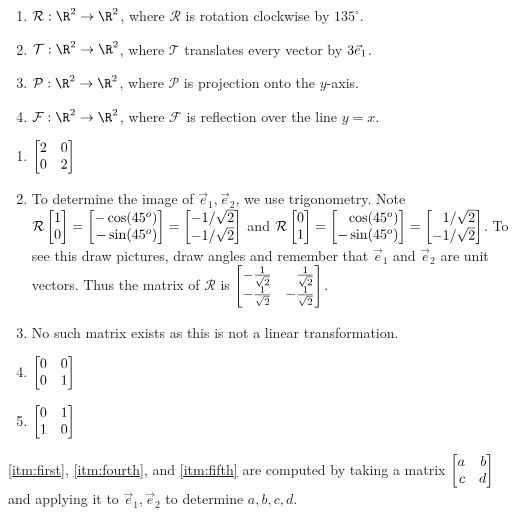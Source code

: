 \begin{exercises}
\begin{problist}
\begin{enumerate}
			\item $\mathcal{R}:\R^{2}\to\R^{2}$, where $\mathcal{R}$ is rotation
				clockwise by $135^{\circ}$.

			\item $\mathcal{T}:\R^{2}\to\R^{2}$, where $\mathcal{T}$ translates every
				vector by $3{\vec e_1}$.

			\item $\mathcal{P}:\R^{2}\to\R^{2}$, where $\mathcal{P}$ is projection
				onto the $y$-axis.

			\item $\mathcal{F}:\R^{2}\to\R^{2}$, where $\mathcal{F}$ is reflection
				over the line $y=x$.
		\end{enumerate}
		\begin{solution}
			\begin{enumerate}
				\item \label{itm:first} $\mat{2 & 0 \\ 0& 2}$

				\item To determine the image of $\vec{e}_{1}, \vec{e}_{2}$, we use
					trigonometry. Note
					$\mathcal{R}\mat{1\\0}= \mat
					{- \cos (45^{o}) \\ - \sin (45^{o})}= \mat
					{- 1/ \sqrt{2} \\ - 1/ \sqrt{2}}$
					and
					$\mathcal{R}\mat{0\\1}= \mat
					{ \cos (45^{o}) \\ - \sin (45^{o})}= \mat
					{ 1/ \sqrt{2} \\ -1/ \sqrt{2}}$. To see this draw pictures,
					draw angles and remember that $\vec{e}_{1}$ and
					$\vec{e}_{2}$ are unit vectors. Thus the matrix of $\mathcal{R}$
					is $\mat
					{- \frac{1 }{\sqrt{2}} & \frac{1 }{\sqrt{2}}\\ - \frac{1}{\sqrt{2}} & -\frac{1}{\sqrt{2}}}$.

				\item No such matrix exists as this is not a linear
					transformation.

				\item \label{itm:fourth} $\mat{0 & 0 \\ 0 & 1}$

				\item \label{itm:fifth} $\mat{0 & 1 \\ 1 & 0}$
			\end{enumerate} \ref{itm:first}, \ref{itm:fourth}, and \ref{itm:fifth}
			are computed by taking a matrix $\mat{a & b \\ c & d}$ and applying it
			to $\vec{e}_{1}, \vec{e}_{2}$ to determine $a,b,c,d$.
		\end{solution}


\end{problist}
\end{exercises}

